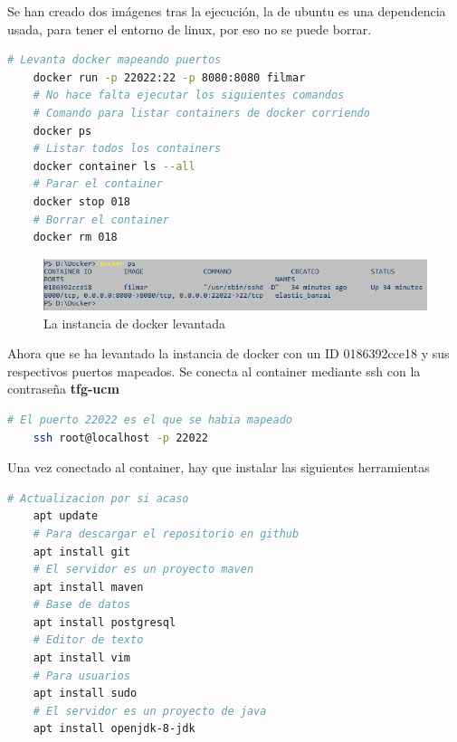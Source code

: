 Se han creado dos imágenes tras la ejecución, la de ubuntu es una dependencia usada, para tener el entorno de linux, por eso no se puede borrar.

\begin{lstlisting}[language=bash, caption=Levantamiento de la instancia de docker]
    # Levanta docker mapeando puertos
    docker run -p 22022:22 -p 8080:8080 filmar 
    # No hace falta ejecutar los siguientes comandos
    # Comando para listar containers de docker corriendo
    docker ps 
    # Listar todos los containers
    docker container ls --all 
    # Parar el container
    docker stop 018 
    # Borrar el container
    docker rm 018 
\end{lstlisting}

\begin{figure}[H]
    \centering
    \includegraphics[width=6in]{figures/appendix-A/list-docker-containers.png}
    \caption{La instancia de docker levantada}
\end{figure}

Ahora que se ha levantado la instancia de docker con un ID 0186392cce18 y sus respectivos puertos mapeados.
Se conecta al container mediante ssh con la contraseña \textbf{tfg-ucm}

\begin{lstlisting}[language=bash, caption=Conexión ssh]
    # El puerto 22022 es el que se habia mapeado
    ssh root@localhost -p 22022
\end{lstlisting}

Una vez conectado al container, hay que instalar las siguientes herramientas

\begin{lstlisting}[language=bash, caption=Instalaciones]
    # Actualizacion por si acaso
    apt update 
    # Para descargar el repositorio en github
    apt install git
    # El servidor es un proyecto maven
    apt install maven
    # Base de datos
    apt install postgresql
    # Editor de texto
    apt install vim
    # Para usuarios
    apt install sudo
    # El servidor es un proyecto de java
    apt install openjdk-8-jdk
\end{lstlisting}



